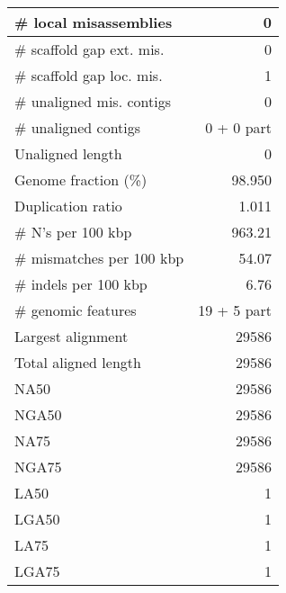 \documentclass[12pt,a4paper]{article}
\begin{document}
\begin{table}[ht]
\begin{center}
\begin{tabular}{|l*{1}{|r}|}
\# local misassemblies & 0 \\ \hline
\# scaffold gap ext. mis. & 0 \\ \hline
\# scaffold gap loc. mis. & 1 \\ \hline
\# unaligned mis. contigs & 0 \\ \hline
\# unaligned contigs & 0 + 0 part \\ \hline
Unaligned length & 0 \\ \hline
Genome fraction (\%) & 98.950 \\ \hline
Duplication ratio & 1.011 \\ \hline
\# N's per 100 kbp & 963.21 \\ \hline
\# mismatches per 100 kbp & 54.07 \\ \hline
\# indels per 100 kbp & 6.76 \\ \hline
\# genomic features & 19 + 5 part \\ \hline
Largest alignment & 29586 \\ \hline
Total aligned length & 29586 \\ \hline
NA50 & 29586 \\ \hline
NGA50 & 29586 \\ \hline
NA75 & 29586 \\ \hline
NGA75 & 29586 \\ \hline
LA50 & 1 \\ \hline
LGA50 & 1 \\ \hline
LA75 & 1 \\ \hline
LGA75 & 1 \\ \hline
\end{tabular}
\end{center}
\end{table}
\end{document}
